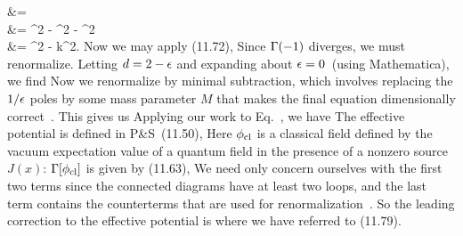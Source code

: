 \documentclass[11pt]{article}
\begin{document}
{{ 		&= \det {} \\
 		&= \sig^2 - \kso^2 - \ksq^2 \\
 		&= \sig^2 - k^2.
 	}
 	Now we may apply (11.72),
 	Since $\Gamma(-1)$ diverges, we must renormalize.  Letting $d = 2 - \epsilon$ and expanding about $\epsilon = 0$~(using Mathematica), we find
 	Now we renormalize by minimal subtraction, which involves replacing the $1 / \epsilon$ poles by some mass parameter $M$ that makes the final equation dimensionally correct~\cite[pp.~376--377]{Peskin}.  This gives us
  	Applying our work to Eq.~, we have
 	The effective potential is defined in P\&S~(11.50),
	Here $\phi_\text{cl}$ is a classical field defined by the vacuum expectation value of a quantum field in the presence of a nonzero source $J(x)$:
	$\Gamma[\phi_\text{cl}]$ is given by (11.63),
 	We need only concern ourselves with the first two terms since the connected diagrams have at least two loops, and the last term contains the counterterms that are used for renormalization~\cite[p.~372]{Peskin}.  So the leading correction to the effective potential is
 	where we have referred to (11.79).
}
\end{document}

